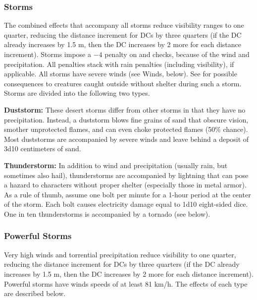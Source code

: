 \subsubsection{Storms}
The combined effects that accompany all storms reduce visibility ranges to one quarter, reducing the distance increment for  DCs by three quarters (if the DC already increases by 1.5 m, then the DC increases by 2 more for each distance increment). Storms impose a $-4$ penalty on  and  checks, because of the wind and precipitation. All penalties stack with rain penalties (including visibility), if applicable. All storms have severe winds (see Winds, below). See  for possible consequences to creatures caught outside without shelter during such a storm. Storms are divided into the following two types.

\textbf{Duststorm:} These desert storms differ from other storms in that they have no precipitation. Instead, a duststorm blows fine grains of sand that obscure vision, smother unprotected flames, and can even choke protected flames (50\% chance). Most duststorms are accompanied by severe winds and leave behind a deposit of 3d10 centimeters of sand.

\textbf{Thunderstorm:} In addition to wind and precipitation (usually rain, but sometimes also hail), thunderstorms are accompanied by lightning that can pose a hazard to characters without proper shelter (especially those in metal armor). As a rule of thumb, assume one bolt per minute for a 1-hour period at the center of the storm. Each bolt causes electricity damage equal to 1d10 eight-sided dice. One in ten thunderstorms is accompanied by a tornado (see below).

\subsubsection{Powerful Storms}
Very high winds and torrential precipitation reduce visibility to one quarter, reducing the distance increment for  DCs by three quarters (if the DC already increases by 1.5 m, then the DC increases by 2 more for each distance increment). Powerful storms have winds speeds of at least 81 km/h. The effects of each type are described below.

